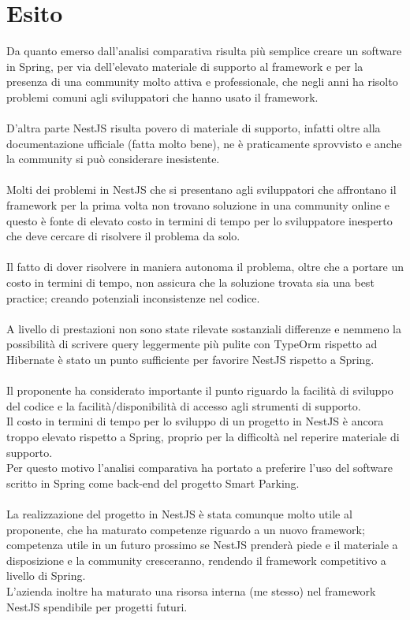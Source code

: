 \section{Esito}
Da quanto emerso dall'analisi comparativa risulta più semplice creare un software in Spring, per via dell'elevato materiale di
supporto al framework e per la presenza di una community molto attiva e professionale, che negli
anni ha risolto problemi comuni agli sviluppatori che hanno usato il framework. 
\\\\
D'altra parte NestJS risulta povero di materiale di supporto, infatti oltre alla documentazione ufficiale (fatta molto
bene), ne è praticamente sprovvisto e anche la community si può considerare inesistente.
\\\\
Molti dei problemi in NestJS che si presentano agli sviluppatori che affrontano il framework per la prima volta non
trovano soluzione in una community online e questo è fonte di elevato costo in termini di tempo per lo sviluppatore 
inesperto che deve cercare di risolvere il problema da solo.
\\\\
Il fatto di dover risolvere in maniera autonoma il problema, oltre che a portare un costo in termini di tempo, non assicura 
che la soluzione trovata sia una best practice; creando potenziali inconsistenze nel codice.
\\\\
A livello di prestazioni non sono state rilevate sostanziali differenze e nemmeno la possibilità di scrivere query 
leggermente più pulite con TypeOrm rispetto ad Hibernate è stato un punto sufficiente per favorire 
NestJS rispetto a Spring.
\\\\
Il proponente ha considerato importante il punto riguardo la facilità di sviluppo del codice
e la facilità/disponibilità di accesso agli strumenti di supporto.
\\
Il costo in termini di tempo per lo sviluppo di un progetto in NestJS è ancora troppo elevato rispetto a Spring, proprio
per la difficoltà nel reperire materiale di supporto.
\\
Per questo motivo l'analisi comparativa ha portato a preferire l'uso del software scritto in Spring come \gls{back-end}
del progetto Smart Parking.
\\\\
La realizzazione del progetto in NestJS è stata comunque molto utile al proponente, che ha maturato competenze riguardo a un nuovo
framework; competenza utile in un futuro prossimo se NestJS prenderà piede e il materiale a 
disposizione e la community cresceranno, rendendo il framework competitivo a livello di Spring.
\\
L'azienda inoltre ha maturato una risorsa interna (me stesso) nel framework NestJS spendibile
per progetti futuri. 
